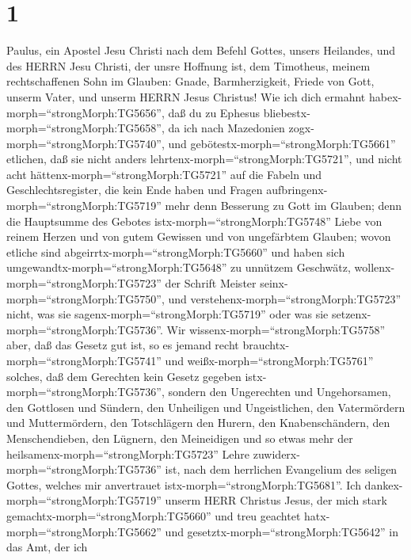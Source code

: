 \hypertarget{section}{%
\section{1}\label{section}}

 Paulus, ein Apostel Jesu Christi nach dem Befehl Gottes,
unsers Heilandes, und des HERRN Jesu Christi, der unsre Hoffnung ist,
 dem Timotheus, meinem rechtschaffenen Sohn im Glauben:
Gnade, Barmherzigkeit, Friede von Gott, unserm Vater, und unserm HERRN
Jesus Christus!  Wie ich dich ermahnt
habex-morph=``strongMorph:TG5656'', daß du zu Ephesus
bliebestx-morph=``strongMorph:TG5658'', da ich nach Mazedonien
zogx-morph=``strongMorph:TG5740'', und
gebötestx-morph=``strongMorph:TG5661'' etlichen, daß sie nicht anders
lehrtenx-morph=``strongMorph:TG5721'',  und nicht acht
hättenx-morph=``strongMorph:TG5721'' auf die Fabeln und
Geschlechtsregister, die kein Ende haben und Fragen
aufbringenx-morph=``strongMorph:TG5719'' mehr denn Besserung zu Gott im
Glauben;  denn die Hauptsumme des Gebotes
istx-morph=``strongMorph:TG5748'' Liebe von reinem Herzen und von gutem
Gewissen und von ungefärbtem Glauben;  wovon etliche sind
abgeirrtx-morph=``strongMorph:TG5660'' und haben sich
umgewandtx-morph=``strongMorph:TG5648'' zu unnützem Geschwätz,
 wollenx-morph=``strongMorph:TG5723'' der Schrift Meister
seinx-morph=``strongMorph:TG5750'', und
verstehenx-morph=``strongMorph:TG5723'' nicht, was sie
sagenx-morph=``strongMorph:TG5719'' oder was sie
setzenx-morph=``strongMorph:TG5736''.  Wir
wissenx-morph=``strongMorph:TG5758'' aber, daß das Gesetz gut ist, so es
jemand recht brauchtx-morph=``strongMorph:TG5741''  und
weißx-morph=``strongMorph:TG5761'' solches, daß dem Gerechten kein
Gesetz gegeben istx-morph=``strongMorph:TG5736'', sondern den
Ungerechten und Ungehorsamen, den Gottlosen und Sündern, den Unheiligen
und Ungeistlichen, den Vatermördern und Muttermördern, den Totschlägern
 den Hurern, den Knabenschändern, den Menschendieben, den
Lügnern, den Meineidigen und so etwas mehr der
heilsamenx-morph=``strongMorph:TG5723'' Lehre
zuwiderx-morph=``strongMorph:TG5736'' ist,  nach dem
herrlichen Evangelium des seligen Gottes, welches mir anvertrauet
istx-morph=``strongMorph:TG5681''.  Ich
dankex-morph=``strongMorph:TG5719'' unserm HERR Christus Jesus, der mich
stark gemachtx-morph=``strongMorph:TG5660'' und treu geachtet
hatx-morph=``strongMorph:TG5662'' und
gesetztx-morph=``strongMorph:TG5642'' in das Amt,  der ich
